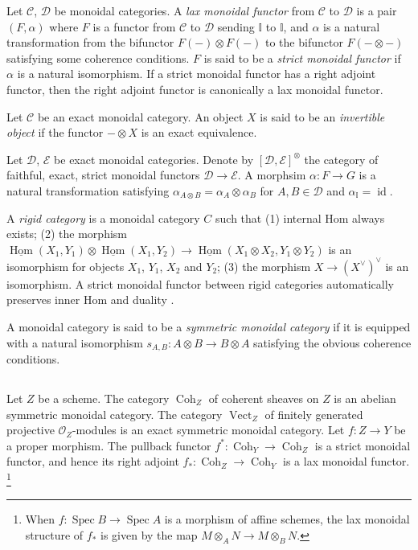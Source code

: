 \documentclass[11pt]{amsart}
\numberwithin{thm}{section}
\numberwithin{lem}{section}
\numberwithin{cor}{section}
\numberwithin{prop}{section}
\numberwithin{exam}{section}
\numberwithin{dfn}{section}
\newcommand{\lax}{{\dagger\otimes}}
\newcommand{\id}{\operatorname{id}}
\newcommand{\Vect}{\operatorname{Vect}}
\newcommand{\Coh}{\operatorname{Coh}}
\newcommand{\iHom}{\underline{\operatorname{Hom}}}
\newcommand{\spec}{\operatorname{Spec}}
\newcommand{\mysection}{\subsection}
\newcommand{\cO}{\mathcal{O}}
\newcommand{\cC}{\mathcal{C}}
\newcommand{\calD}{\mathcal{D}}
\newcommand{\cE}{{\mathcal{E}}}
\newcommand{\bI}{\mathbb{I}}
\begin{document}
\begin{appendices}
Let $\cC$, $\calD$ be monoidal categories.
A \textit{lax monoidal functor} from $\cC$ to $\calD$
is a pair $(F, \alpha)$ where $F$ is a functor from
$\cC$ to $\calD$ sending $\bI$ to $\bI$,
and $\alpha$ is a natural transformation
from the bifunctor $F(-)\otimes F(-)$ to 
the bifunctor $F(-\otimes -)$
satisfying some coherence conditions.
$F$ is said to be a \textit{strict monoidal functor}
if $\alpha$ is a natural isomorphism.
If a strict monoidal functor has a right adjoint functor,
then the right adjoint functor is canonically a lax monoidal functor.

Let $\cC$ be an exact monoidal category.
An object $X$ is said to be an \textit{invertible object}
if the functor $-\otimes X$ is an exact equivalence.

Let $\calD$, $\cE$ be exact monoidal categories.
Denote by $[\calD, \cE]^{\otimes}$
the category of faithful, exact, strict monoidal functors
$\calD\to\cE$.
A morphsim $\alpha:F\to G$ is a natural transformation satisfying
$\alpha_{A\otimes B}=\alpha_A\otimes\alpha_B$ for $A, B\in\calD$
and $\alpha_{\bI}=\id$.

A \textit{rigid category} is a monoidal category $C$ such that
(1) internal Hom always exists; (2) the morphism
$\iHom(X_1, Y_1)\otimes\iHom(X_1,Y_2) \to \iHom(X_1\otimes X_2,Y_1\otimes Y_2)$ is an isomorphism for objects $X_1$, $Y_1$, $X_2$ and $Y_2$;
(3) the morphism $X \to (X^{\vee})^{\vee}$ is an isomorphism.
A strict monoidal functor between rigid categories automatically
preserves inner Hom and duality \cite[Proposition 1.9]{DM82}.

A monoidal category is said to be a \textit{symmetric monoidal category}
if it is equipped with a natural isomorphism
$s_{A,B}: A\otimes B \to B\otimes A$ satisfying the obvious
coherence conditions.



\mysection{}

Let $Z$ be a scheme.
The category $\Coh_Z$ of coherent sheaves on $Z$
is an abelian symmetric monoidal category.
The category $\Vect_Z$ of finitely generated projective $\cO_Z$-modules
is an exact symmetric monoidal category.
Let $f: Z\to Y$ be a proper morphism.
The pullback functor $f^*:\Coh_Y \to \Coh_Z$
is a strict monoidal functor,
and hence its right adjoint $f_*: \Coh_Z \to \Coh_Y$
is a lax monoidal functor.
\footnote{
    When $f: \spec B \to \spec A$ is a morphism of affine schemes,
    the lax monoidal structure of $f_*$ is given by the map
    $M\otimes_AN \to M\otimes_B N$.
}


\end{appendices}
\end{document}
